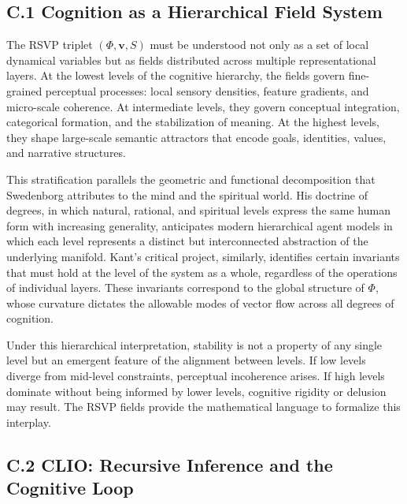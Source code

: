 \documentclass[12pt]{article}
\begin{document}
\subsection*{C.1 Cognition as a Hierarchical Field System}

The RSVP triplet $(\Phi, \mathbf{v}, S)$ must be understood not only as a set 
of local dynamical variables but as fields distributed across multiple 
representational layers. At the lowest levels of the cognitive hierarchy, the 
fields govern fine-grained perceptual processes: local sensory densities, 
feature gradients, and micro-scale coherence. At intermediate levels, they 
govern conceptual integration, categorical formation, and the stabilization of 
meaning. At the highest levels, they shape large-scale semantic attractors that 
encode goals, identities, values, and narrative structures.

This stratification parallels the geometric and functional decomposition that 
Swedenborg attributes to the mind and the spiritual world. His doctrine of 
degrees, in which natural, rational, and spiritual levels express the same 
human form with increasing generality, anticipates modern hierarchical agent 
models in which each level represents a distinct but interconnected abstraction 
of the underlying manifold. Kant’s critical project, similarly, identifies 
certain invariants that must hold at the level of the system as a whole, 
regardless of the operations of individual layers. These invariants correspond 
to the global structure of $\Phi$, whose curvature dictates the allowable modes 
of vector flow across all degrees of cognition.

Under this hierarchical interpretation, stability is not a property of any 
single level but an emergent feature of the alignment between levels. If low 
levels diverge from mid-level constraints, perceptual incoherence arises. If 
high levels dominate without being informed by lower levels, cognitive rigidity 
or delusion may result. The RSVP fields provide the mathematical language to 
formalize this interplay.

\subsection*{C.2 CLIO: Recursive Inference and the Cognitive Loop}
\end{document}
